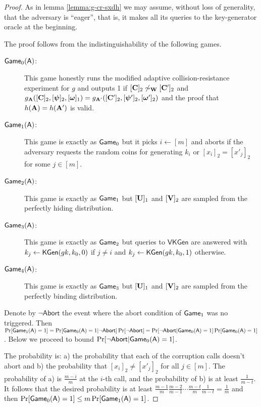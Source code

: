 \begin{proof}
As in lemma \ref{lemma:g-cr-sxdh} we may assume, without loss of generality, that the adversary is ``eager'', that is, it makes all its queries to the key-generator oracle at the beginning.

The proof follows from the indistinguishability of the following games.
\begin{description}
\item[$\mathsf{Game}_0(\mathsf{A})$:] This game honestly runs the modified adaptive collision-resistance experiment for $g$ and outputs 1 if $[\mathbf{{C}}]_2 \not\sim_{\mathbf{{W}}}[\mathbf{{C}}']_2$ and $g_{\mathbf{{A}}}([\mathbf{{C}}]_2,[{\boldsymbol{\psi}}]_2,\allowbreak [{\boldsymbol{\omega}}]_1)=g_{\mathbf{{A}}'}([\mathbf{{C}}']_2,[{\boldsymbol{\psi}}']_2,[{\boldsymbol{\omega}}']_2)$ and the proof that $h(\mathbf{{A}})=h(\mathbf{{A}}')$ is valid.
\item[$\mathsf{Game}_1(\mathsf{A})$:] This game is exactly as $\mathsf{Game}_0$ but it picks $i\gets[m]$ and aborts if the adversary requests the random coins for generating $k_i$ or $[x_i]_2=[x'_j]_2$ for some $j\in[m]$.
\item[$\mathsf{Game}_2(\mathsf{A})$:] This game is exactly as $\mathsf{Game}_1$ but $[\mathbf{{U}}]_1$ and $[\mathbf{{V}}]_2$ are sampled from the perfectly hiding distribution.
\item[$\mathsf{Game}_3(\mathsf{A})$:] This game is exactly as $\mathsf{Game}_2$ but queries to $\mathsf{VKGen}$ are answered with $k_j\gets\mathsf{KGen}(gk,k_0,0)$ if $j\neq i$ and $k_j\gets\mathsf{KGen}(gk,k_0,1)$ otherwise.
\item[$\mathsf{Game}_4(\mathsf{A})$:] This game is exactly as $\mathsf{Game}_3$ but $[\mathbf{{U}}]_1$ and $[\mathbf{{V}}]_2$ are sampled from the perfectly binding distribution.
\end{description}
Denote by $\neg\mathsf{Abort}$ the event where the abort condition of $\mathsf{Game}_1$ was no triggered. Then
$
\Pr[\mathsf{Game}_1(\mathsf{A})=1] = \Pr[\mathsf{Game}_0(\mathsf{A})=1|\neg\mathsf{Abort}]\Pr[\neg\mathsf{Abort}]
=\Pr[\neg\mathsf{Abort}|\allowbreak\mathsf{Game}_0(\mathsf{A})=1]\Pr[\mathsf{Game}_0(\mathsf{A})=1]$.
Below we proceed to bound $\Pr[\neg\mathsf{Abort}|\mathsf{Game}_0(\mathsf{A})=1]$.

The probability is: a) the probability that each of the corruption calls doesn't abort and b) the probability that $[x_i]_2\neq[x'_j]_2$ for all $j\in[m]$. The probability of a) is $\frac{m-i}{m}$ at the $i$-th call, and the probability of b) is at least $\frac{1}{m-t}$. It follows that the desired probability is at least $\frac{m-1}{m}\frac{m-2}{m-1}\cdots\frac{m-t}{m}\frac{1}{m-t}=\frac{1}{m}$ and then $\Pr[\mathsf{Game}_0(\mathsf{A})=1]\leq m \Pr[\mathsf{Game}_1(\mathsf{A})=1]$.


\end{proof}
